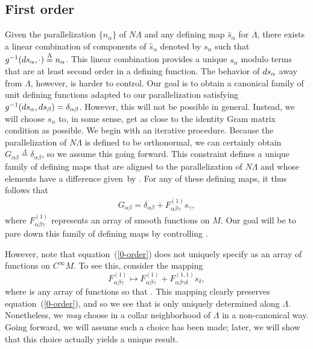 \documentclass[10pt,a4paper]{article}
\numberwithin{equation}{section}
\renewcommand{\=}{\stackrel \Lambda =}
\begin{document}
\subsection{First order} \label{fo-Riem}
Given the parallelization $\{n_{\alpha}\}$ of $N \Lambda$ and any defining map $\hat{s}_{\alpha}$ for $\Lambda$, there exists a linear combination of components of $\hat{s}_{\alpha}$ denoted by $s_{\alpha}$ such that $g^{-1}({\rm d}s_{\alpha},\cdot) \= n_{\alpha}$. This linear combination provides a unique $s_{\alpha}$ modulo terms that are at least second order in a defining function. The behavior of ${\rm d}s_{\alpha}$ away from $\Lambda$, however, is harder to control. Our goal is to obtain a canonical family of unit defining functions adapted to our parallelization satisfying $g^{-1}({\rm d}s_{\alpha},{\rm d}s_{\beta}) = \delta_{\alpha \beta}$. However, this will not be possible in general. Instead, we will choose $s_{\alpha}$ to, in some sense, get as close to the identity Gram matrix condition as possible.
We begin with an iterative procedure. Because the parallelization of $N \Lambda$ is defined to be orthonormal, we can certainly obtain $G_{\alpha \beta} \= \delta_{\alpha \beta}$, so we assume this going forward. This constraint defines a unique family of defining maps that are aligned to the parallelization of $N \Lambda$ and whose elements have a difference given~by . For any of these defining maps, it thus follows that
\begin{align} \label{0-order}
G_{\alpha \beta} = \delta_{\alpha \beta} + F^{(1)}_{\alpha \beta \gamma} s_{\gamma} ,
\end{align}
where $F^{(1)}_{\alpha \beta \gamma}$ represents an array of smooth functions on $M$. Our goal will be to pare down this family of defining maps by controlling .

However, note that equation~(\ref{0-order}) does not uniquely specify  as an array of functions on $C^\infty M$. To see this, consider the mapping
\[
F^{(1)}_{\alpha \beta \gamma} \mapsto F^{(1)}_{\alpha \beta \gamma} + F^{(1,1)}_{\alpha \beta \gamma \delta} s_{\delta} ,
\]
where  is any array of functions so that . This mapping clearly preserves equation~(\ref{0-order}), and so we see that  is only uniquely determined along $\Lambda$. Nonetheless, we \textit{may} choose  in a collar neighborhood of $\Lambda$ in a non-canonical way. Going forward, we will assume such a choice has been made; later, we will show that this choice actually yields a unique result.
\end{document}
